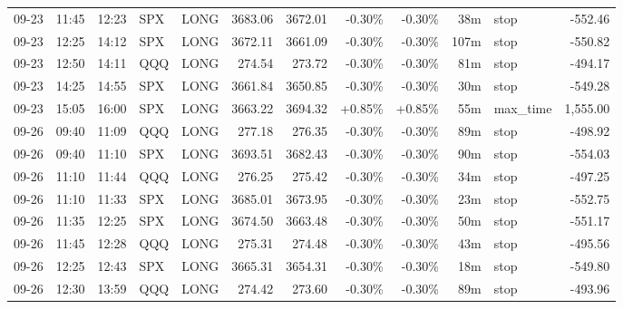 \documentclass[11pt,a4paper,twoside]{article}
\begin{document}
\begin{center}
\begin{longtable}{>{\color{txtmain}}l l l l l r r r r r >{\color{txtmain}}l r}
09-23 & 11:45 & 12:23 & SPX & LONG & 3683.06 & 3672.01 & \textcolor{lossred}{-0.30\%} & \textcolor{lossred}{-0.30\%} & 38m & stop & \textcolor{lossred}{-552.46} \\
09-23 & 12:25 & 14:12 & SPX & LONG & 3672.11 & 3661.09 & \textcolor{lossred}{-0.30\%} & \textcolor{lossred}{-0.30\%} & 107m & stop & \textcolor{lossred}{-550.82} \\
09-23 & 12:50 & 14:11 & QQQ & LONG & 274.54 & 273.72 & \textcolor{lossred}{-0.30\%} & \textcolor{lossred}{-0.30\%} & 81m & stop & \textcolor{lossred}{-494.17} \\
09-23 & 14:25 & 14:55 & SPX & LONG & 3661.84 & 3650.85 & \textcolor{lossred}{-0.30\%} & \textcolor{lossred}{-0.30\%} & 30m & stop & \textcolor{lossred}{-549.28} \\
09-23 & 15:05 & 16:00 & SPX & LONG & 3663.22 & 3694.32 & \textcolor{wingreen}{+0.85\%} & \textcolor{wingreen}{+0.85\%} & 55m & max\_time & \textcolor{wingreen}{1,555.00} \\
09-26 & 09:40 & 11:09 & QQQ & LONG & 277.18 & 276.35 & \textcolor{lossred}{-0.30\%} & \textcolor{lossred}{-0.30\%} & 89m & stop & \textcolor{lossred}{-498.92} \\
09-26 & 09:40 & 11:10 & SPX & LONG & 3693.51 & 3682.43 & \textcolor{lossred}{-0.30\%} & \textcolor{lossred}{-0.30\%} & 90m & stop & \textcolor{lossred}{-554.03} \\
09-26 & 11:10 & 11:44 & QQQ & LONG & 276.25 & 275.42 & \textcolor{lossred}{-0.30\%} & \textcolor{lossred}{-0.30\%} & 34m & stop & \textcolor{lossred}{-497.25} \\
09-26 & 11:10 & 11:33 & SPX & LONG & 3685.01 & 3673.95 & \textcolor{lossred}{-0.30\%} & \textcolor{lossred}{-0.30\%} & 23m & stop & \textcolor{lossred}{-552.75} \\
09-26 & 11:35 & 12:25 & SPX & LONG & 3674.50 & 3663.48 & \textcolor{lossred}{-0.30\%} & \textcolor{lossred}{-0.30\%} & 50m & stop & \textcolor{lossred}{-551.17} \\
09-26 & 11:45 & 12:28 & QQQ & LONG & 275.31 & 274.48 & \textcolor{lossred}{-0.30\%} & \textcolor{lossred}{-0.30\%} & 43m & stop & \textcolor{lossred}{-495.56} \\
09-26 & 12:25 & 12:43 & SPX & LONG & 3665.31 & 3654.31 & \textcolor{lossred}{-0.30\%} & \textcolor{lossred}{-0.30\%} & 18m & stop & \textcolor{lossred}{-549.80} \\
09-26 & 12:30 & 13:59 & QQQ & LONG & 274.42 & 273.60 & \textcolor{lossred}{-0.30\%} & \textcolor{lossred}{-0.30\%} & 89m & stop & \textcolor{lossred}{-493.96} \\

\end{longtable}
\end{center}
\end{document}
